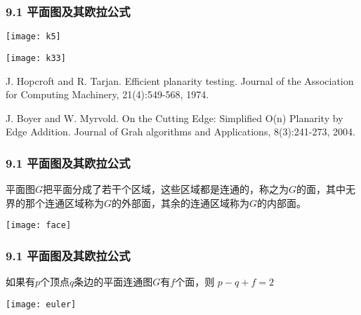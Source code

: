 \documentclass{beamer}
\begin{document}
\begin{CJK}{UTF8}{gbsn}
\begin{frame}
  \frametitle{9.1 平面图及其欧拉公式}
  \begin{minipage}{0.45\linewidth}
\texttt{[image: k5]}    
  \end{minipage}
\pause
  \begin{minipage}{0.45\linewidth}
    \texttt{[image: k33]}
  \end{minipage}
\pause
  \begin{thebibliography}{99}
  J. Hopcroft and R. Tarjan.
\newblock Efficient planarity testing.
\newblock Journal of the Association for Computing Machinery, 21(4):549-568, 1974.
  \end{thebibliography}
\pause
  \begin{thebibliography}{99}
  J. Boyer and W. Myrvold.
\newblock On the Cutting Edge: Simplified O(n) Planarity by Edge Addition.
\newblock Journal of Grah algorithms and Applications, 8(3):241-273, 2004.
  \end{thebibliography}
\end{frame}
\begin{frame}
  \frametitle{9.1 平面图及其欧拉公式}
  \begin{Def}
    平面图$G$把平面分成了若干个区域，这些区域都是连通的，称之为$G$的\alert{面}，其中无界的那个连通区域称为$G$的\alert{外部面}，其余的连通区域称为$G$的\alert{内部面}。
  \end{Def}    
  \texttt{[image: face]}
\end{frame}
\begin{frame}
  \frametitle{9.1 平面图及其欧拉公式}
  \begin{Thm}
    如果有$p$个顶点$q$条边的平面连通图$G$有$f$个面，则
      $p - q + f = 2$
  \end{Thm}
\vspace{1cm}
\centering
    \texttt{[image: euler]}
\end{frame}


\end{CJK}
\end{document}
